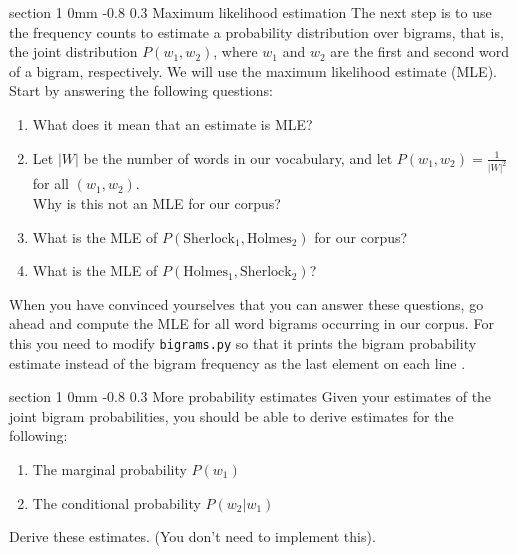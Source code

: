 \documentclass[11pt]{article}
\makeatletter
\newcommand{\newsec}[2]{\section{#1}\label{sec:#2}\noindent}
\renewcommand{\section}{\@startsection
{section}%
{1}%
{0mm}%
{-0.8\baselineskip}%
{0.3\baselineskip}%
{\bfseries\large}}%
\makeatother
\begin{document}
\newsec{Maximum likelihood estimation }{mle}%
The next step is to use the frequency counts to estimate a probability
distribution over bigrams, that is, the joint distribution $P(w_1,
w_2)$, where $w_1$ and $w_2$ are the first and second word of a
bigram, respectively.  We will use the maximum likelihood estimate
(MLE). Start by answering the following questions:
\begin{enumerate}[itemsep=0pt]
\item  What does it mean that an estimate is MLE? %
\item  Let $|W|$ be the number of words in our vocabulary, and let $P(w_1, w_2) = \frac{1}{|W|^2}$ for all $(w_1, w_2)$.\\
  Why is this not an MLE for our
  corpus? %
\item  What is the MLE of $P(\mbox{Sherlock}_1, \mbox{Holmes}_2)$ for
  our corpus? %
\item  What is the MLE of $P(\mbox{Holmes}_1, \mbox{Sherlock}_2)$? %
\end{enumerate}
When you have convinced yourselves that you can answer these
questions, go ahead and compute the MLE for all word bigrams occurring
in our corpus. For this you need to modify {\tt bigrams.py} so that it
prints the bigram probability estimate instead of the bigram frequency
as the last element on each line .

\newsec{More probability estimates }{refine}%
Given your estimates of the joint bigram probabilities, you should be
able to derive estimates for the following:
\begin{enumerate}[itemsep=0pt]
\item  The marginal probability $P(w_1)$
\item  The conditional probability $P(w_2 | w_1)$
\end{enumerate}
Derive these estimates. (You don't need to implement this).
\end{document}
